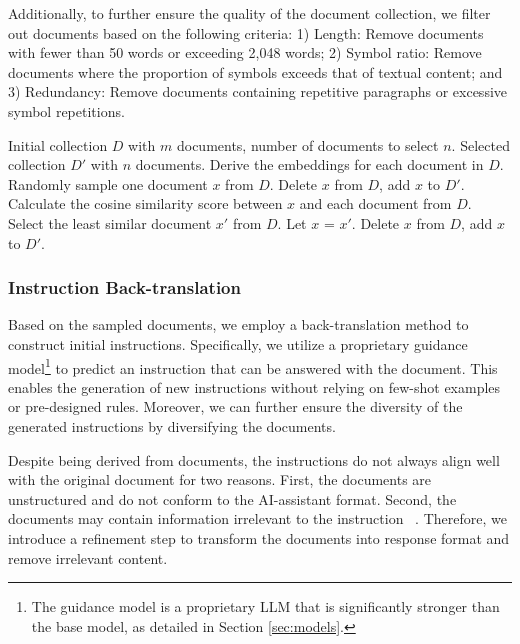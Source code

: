 Additionally, to further ensure the quality of the document collection, we filter out documents based on the following criteria: 1) Length: Remove documents with fewer than 50 words or exceeding 2,048 words; 2) Symbol ratio: Remove documents where the proportion of symbols exceeds that of textual content; and 3) Redundancy: Remove documents containing repetitive paragraphs or excessive symbol repetitions.


\begin{algorithm}[t]
  \renewcommand{\algorithmicrequire}{\textbf{Input:}}
  \renewcommand{\algorithmicensure}{\textbf{Output:}}
  \caption{Density-based Document Sampling}
  \begin{algorithmic}[1]
      \REQUIRE Initial collection $D$ with $m$ documents, number of documents to select $n$. 
      \ENSURE Selected collection $D'$ with $n$ documents.
      \STATE Derive the embeddings for each document in $D$.
      \STATE Randomly sample one document $x$ from $D$.
      \STATE Delete $x$ from $D$, add $x$ to $D'$.
          \STATE Calculate the cosine similarity score between $x$ and each document from $D$.
          \STATE Select the least similar document $x'$ from $D$.
          \STATE Let $x$ = $x'$.
          \STATE Delete $x$ from $D$, add $x$ to $D'$. 
      \ENDFOR
  \end{algorithmic}
\label{Alg:density}
\end{algorithm}

\subsubsection{Instruction Back-translation}
Based on the sampled documents, we employ a back-translation \citep{li2023self} method to construct initial instructions. Specifically, we utilize a proprietary guidance model\footnote{The guidance model is a proprietary LLM that is significantly stronger than the base model, as detailed in Section \ref{sec:models}.} to predict an instruction that can be answered with the document. This enables the generation of new instructions without relying on few-shot examples or pre-designed rules. Moreover, we can further ensure the diversity of the generated instructions by diversifying the documents.

Despite being derived from documents, the instructions do not always align well with the original document for two reasons. First, the documents are unstructured and do not conform to the AI-assistant format. Second, the documents may contain information irrelevant to the instruction ~\citep{nguyen2024better}. Therefore, we introduce a refinement step to transform the documents into response format and remove irrelevant content.

